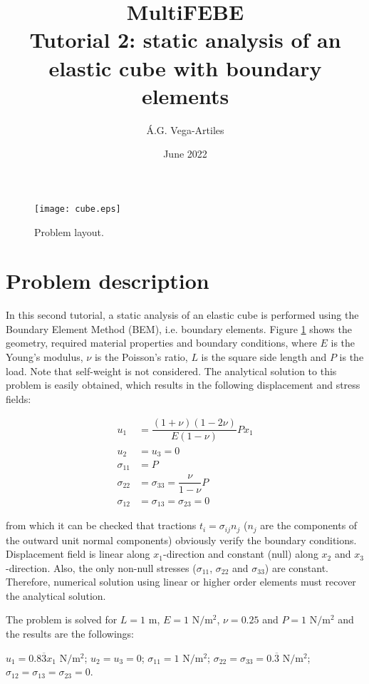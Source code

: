 \documentclass[a4]{article}
\title{MultiFEBE \\ Tutorial 2: static analysis of an elastic cube with boundary elements}
\author{\'A.G. Vega-Artiles}
\date{June 2022}
\begin{document}
\maketitle

\begin{figure}[h]
	\centering
	\texttt{[image: cube.eps]}
	\caption{Problem layout.}
	\label{fig:layout}
\end{figure}

\section{Problem description}

In this second tutorial, a static analysis of an elastic cube is performed using the Boundary Element Method (BEM), i.e. boundary elements. Figure \ref{fig:layout} shows the geometry, required material properties and boundary conditions, where $E$ is the Young's modulus, $\nu$ is the Poisson's ratio, $L$ is the square side length and $P$ is the load. Note that self-weight is not considered. The analytical solution to this problem is easily obtained, which results in the following displacement and stress fields:

\begin{align}
u_1 &= \dfrac{(1+\nu)(1-2\nu)}{E(1-\nu)} P x_1 \\
u_2 &= u_3 = 0 \\
\sigma_{11} &= P \\
\sigma_{22} &= \sigma_{33} = \dfrac{\nu}{1-\nu}P \\
\sigma_{12} &= \sigma_{13} = \sigma_{23}= 0
\end{align}

from which it can be checked that tractions $t_i=\sigma_{ij}n_j$ ($n_j$ are the components of the outward unit normal components) obviously verify the boundary conditions. Displacement field is linear along $x_1$-direction and constant (null) along $x_2$ and $x_3$-direction. Also, the only non-null stresses ($\sigma_{11}$, $\sigma_{22}$ and $\sigma_{33}$) are constant. Therefore, numerical solution using linear or higher order elements must recover the analytical solution.

The problem is solved for $L=1$ $\mathrm{m}$, $E=1$ $\mathrm{N/m^2}$, $\nu=0.25$  and $P=1$ $\mathrm{N/m^2}$ and the results are the followings:

	$u_1 = 0.8\overline{3} x_1$ $\mathrm{N/m^2}$;
	$u_2 = u_3 = 0$;
	$\sigma_{11} = 1$ $\mathrm{N/m^2}$;
	$\sigma_{22} = \sigma_{33} = 0.\overline{3}$ $\mathrm{N/m^2}$;
	$\sigma_{12} = \sigma_{13} = \sigma_{23} = 0$.
\end{document}

